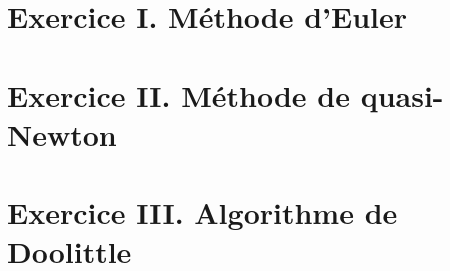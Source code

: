 

\section*{Exercice I. Méthode d'Euler}

\section*{Exercice II.  Méthode de quasi-Newton}

\clearpage
\section*{Exercice III. Algorithme de Doolittle}

